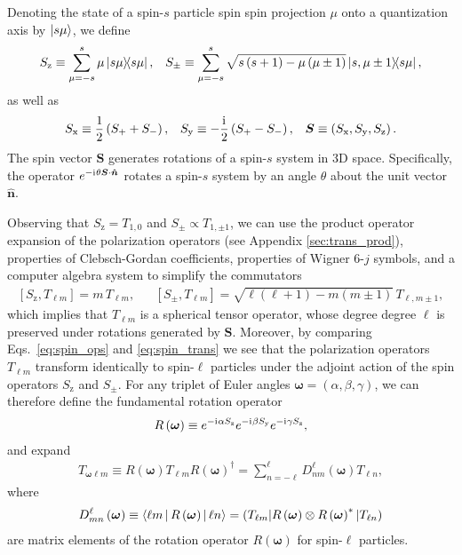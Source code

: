 \documentclass[notitlepage,twocolumn]{revtex4-2}
\newcommand{\f}[2]{\dfrac{#1}{#2}} %
\newcommand{\p}[1]{\left(#1\right)} %
\renewcommand{\sp}[1]{\left[#1\right]} %
\newcommand{\bk}{\Braket} %
\renewcommand{\v}{\bm} %
\newcommand{\uv}[1]{\bm{\hat{#1}}} %
\renewcommand{\i}{\mathrm{i}\mkern1mu} %
\newcommand{\x}{\text{x}}
\newcommand{\y}{\text{y}}
\newcommand{\z}{\text{z}}
\def\obk#1{\mathinner{({#1})}}
\begin{document}
Denoting the state of a spin-$s$ particle spin spin projection $\mu$ onto a quantization axis by $\ket{s\mu}$, we define
\begin{align}
  S_\z \equiv \sum_{\mu=-s}^s \mu \op{s\mu},
  &&
  S_\pm \equiv \sum_{\mu=-s}^s
  \sqrt{s\p{s+1}-\mu\p{\mu\pm1}} \op{s,\mu\pm1}{s\mu},
  \label{eq:spin_ops}
\end{align}
as well as
\begin{align}
  S_\x \equiv \f12\p{S_+ + S_-},
  &&
  S_\y \equiv -\f\i2\p{S_+-S_-},
  &&
  \v S \equiv \p{S_\x,S_\y,S_\z}.
\end{align}
The spin vector $\v S$ generates rotations of a spin-$s$ system in 3D space.
Specifically, the operator $e^{-\i\theta\v S\cdot\uv n}$ rotates a spin-$s$ system by an angle $\theta$ about the unit vector $\uv n$.

Observing that $S_\z=T_{1,0}$ and $S_\pm\propto T_{1,\pm1}$, we can use the product operator expansion of the polarization operators (see Appendix \ref{sec:trans_prod}), properties of Clebsch-Gordan coefficients, properties of Wigner $6$-$j$ symbols, and a computer algebra system to simplify the commutators
\begin{align}
  \sp{S_\z,T_{\ell m}} = m\, T_{\ell m},
  &&
  \sp{S_\pm,T_{\ell m}} = \sqrt{\ell\p{\ell+1}-m\p{m\pm 1}}\, T_{\ell,m\pm1},
  \label{eq:spin_trans}
\end{align}
which implies that $T_{\ell m}$ is a spherical tensor operator, whose degree degree $\ell$ is preserved under rotations generated by $\v S$.
Moreover, by comparing Eqs.~\eqref{eq:spin_ops} and \eqref{eq:spin_trans} we see that the polarization operators $T_{\ell m}$ transform identically to spin-$\ell$ particles under the adjoint action of the spin operators $S_\z$ and $S_\pm$.
For any triplet of Euler angles $\v\omega=\p{\alpha,\beta,\gamma}$, we can therefore define the fundamental rotation operator
\begin{align}
  R\p{\v\omega} \equiv
  e^{-\i\alpha S_\z} e^{-\i\beta S_\y} e^{-\i\gamma S_\z},
\end{align}
and expand
\begin{align}
  T_{\v\omega\ell m}
  \equiv R\p{\v\omega} T_{\ell m} R\p{\v\omega}^\dag
  = \sum_{n=-\ell}^\ell D_{nm}^\ell\p{\v\omega} T_{\ell n},
\end{align}
where
\begin{align}
  D_{mn}^\ell\p{\v\omega} \equiv \bk{\ell m|R\p{\v\omega}|\ell n}
  = \obk{T_{\ell m}|R\p{\v\omega}\otimes R\p{\v\omega}^*|T_{\ell n}}
\end{align}
are matrix elements of the rotation operator $R\p{\v\omega}$ for spin-$\ell$ particles.
\end{document}
